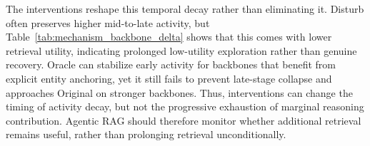\documentclass{article} %
\begin{document}
The interventions reshape this temporal decay rather than eliminating it. Disturb often preserves higher mid-to-late activity, but Table~\ref{tab:mechanism_backbone_delta} shows that this comes with lower retrieval utility, indicating prolonged low-utility exploration rather than genuine recovery. Oracle can stabilize early activity for backbones that benefit from explicit entity anchoring, yet it still fails to prevent late-stage collapse and approaches Original on stronger backbones. Thus, interventions can change the timing of activity decay, but not the progressive exhaustion of marginal reasoning contribution. Agentic RAG should therefore monitor whether additional retrieval remains useful, rather than prolonging retrieval unconditionally.

\end{document}
